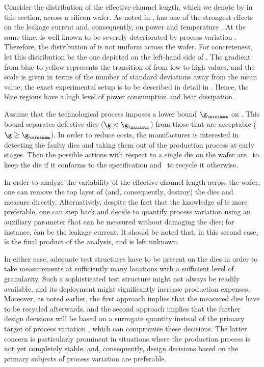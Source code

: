 Consider the distribution of the effective channel length, which we denote by \g
in this section, across a silicon wafer. As noted in , \g has
one of the strongest effects on the leakage current and, consequently, on power
and temperature \cite{juan2012}. At the same time, \g is well known to be
severely deteriorated by process variation \cite{chandrakasan2000,
srivastava2010}. Therefore, the distribution of \g is not uniform across the
wafer. For concreteness, let this distribution be the one depicted on the
left-hand side of . The gradient from blue
to yellow represents the transition of \g from low to high values, and the scale
is given in terms of the number of standard deviations away from the mean value;
the exact experimental setup is to be described in detail in
. Hence, the blue regions have a high level of power
consumption and heat dissipation.

Assume that the technological process imposes a lower bound $\g_\minimum$ on \g.
This bound separates defective dies ($\g < \g_\minimum$) from those that are
acceptable ($\g \geq \g_\minimum$). In order to reduce costs, the manufacturer
is interested in detecting the faulty dies and taking them out of the production
process at early stages. Then the possible actions with respect to a single die
on the wafer are \one~to keep the die if it conforms to the specification and
\two~to recycle it otherwise.

In order to analyze the variability of the effective channel length \g across
the wafer, one can remove the top layer of (and, consequently, destroy) the dies
and measure \g directly. Alternatively, despite the fact that the knowledge of
\g is more preferable, one can step back and decide to quantify process
variation using an auxiliary parameter \h that can be measured without damaging
the dies; for instance, \h can be the leakage current. It should be noted that,
in this second case, \h is the final product of the analysis, and \g is left
unknown.

In either case, adequate test structures have to be present on the dies in order
to take measurements at sufficiently many locations with a sufficient level of
granularity. Such a sophisticated test structure might not always be readily
available, and its deployment might significantly increase production expenses.
Moreover, as noted earlier, the first approach implies that the measured dies
have to be recycled afterwards, and the second approach implies that the further
design decisions will be based on a surrogate quantity \h instead of the primary
target of process variation \g, which can compromise these decisions. The latter
concern is particularly prominent in situations where the production process is
not yet completely stable, and, consequently, design decisions based on the
primary subjects of process variation are preferable.

